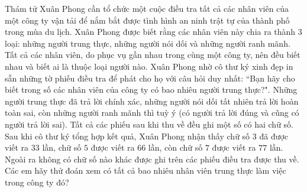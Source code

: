 \begin{multicols}{2}
	Thám tử Xuân Phong cần tổ chức một cuộc điều tra tất cả các nhân viên của một công ty vận tải để nắm bắt được tình hình an ninh trật tự của thành phố trong mùa du lịch. Xuân Phong được biết rằng các nhân viên này chia ra thành $3$ loại: những người trung thực, những người nói dối và những người ranh mãnh. Tất cả các nhân viên, do phục vụ gần nhau trong cùng một công ty, nên đều biết nhau và biết ai là thuộc loại người nào. Xuân Phong nhờ cô thư ký xinh đẹp in sẵn những tờ phiếu điều tra để phát cho họ với câu hỏi duy nhất: ``Bạn hãy cho biết trong số các nhân viên của công ty có bao nhiêu người trung thực?". Những người trung thực đã trả lời chính xác, những người nói dối tất nhiên trả lời hoàn toàn sai, còn những người ranh mãnh thì tuỳ ý (có người trả lời đúng và cũng có người trả lời sai). Tất cả các phiếu sau khi thu về đều ghi một số có hai chữ số. Sau khi cô thư ký tổng hợp kết quả, Xuân Phong nhận thấy chữ số $3$ đã được viết ra $33$ lần, chữ số $5$ được viết ra $66$ lần, còn chữ số $7$ được viết ra $77$ lần. Ngoài ra không có chữ số nào khác được ghi trên các phiếu điều tra được thu về. Các em hãy thử đoán xem có tất cả bao nhiêu nhân viên trung thực làm việc trong công ty đó?

\end{multicols}
